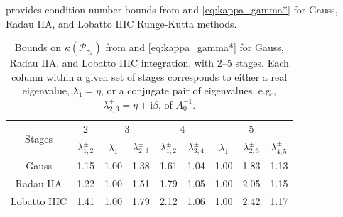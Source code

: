 \documentclass[review]{siamart}
\begin{document}
 provides condition number bounds from  and
\eqref{eq:kappa_gamma*} for Gauss, Radau IIA, and Lobatto IIIC Runge-Kutta methods.
{
\renewcommand{\arraystretch}{1.15}
\begin{table}[!ht]
  \centering
  \begin{tabular}{| c | c | cc | cc | ccc |}  %
  \hline
\multirow{2}{*}{Stages} & 2 & \multicolumn{2}{c}{3} & \multicolumn{2}{|c}{4} & \multicolumn{3}{|c|}{5} \\

& {$\lambda_{1,2}^\pm$} & {$\lambda_1$} & {$\lambda_{2,3}^\pm$} & {$\lambda_{1,2}^\pm$} &
	{$\lambda_{3,4}^\pm$} & {$\lambda_1$} & {$\lambda_{2,3}^\pm$} & {$\lambda_{4,5}^\pm$} \\
\hline
Gauss & 1.15 & 1.00 & 1.38 & 1.61 & 1.04 & 1.00 & 1.83 & 1.13 \\
Radau IIA & 1.22 & 1.00 & 1.51 & 1.79 & 1.05 & 1.00 & 2.05 & 1.15 \\
Lobatto IIIC & 1.41 & 1.00 & 1.79 & 2.12 & 1.06 & 1.00 & 2.42 & 1.17 \\\hline
  \end{tabular}
  \caption{Bounds on $\kappa(\mathcal{P}_{\gamma_*})$ from  and
  \eqref{eq:kappa_gamma*} for Gauss, Radau IIA, and Lobatto IIIC integration,
  with 2--5 stages. Each column within a given set of stages corresponds
  to either a real eigenvalue, $\lambda_1 = \eta$, or a conjugate pair of eigenvalues,
  e.g., $\lambda_{2,3}^\pm = \eta \pm \mathrm{i}\beta$, of
  $A_0^{-1}$.}\label{tab:cond}
\end{table}
\vspace{-3ex}
}
\end{document}
